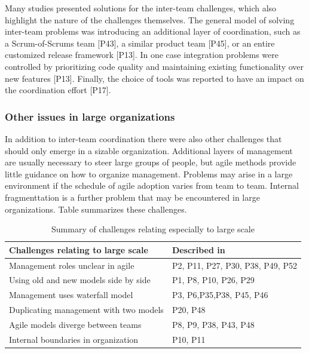\documentclass[preprint,authoryear,12pt]{elsarticle}
\begin{document}
Many studies presented solutions for the inter-team challenges, which also
highlight the nature of the challenges themselves. The general model of solving
inter-team problems was introducing an additional layer of coordination, such as
a Scrum-of-Scrums team [P43], a similar product team [P45], or an entire
customized release framework [P13]. In one case integration problems were
controlled by prioritizing code quality and maintaining existing functionality
over new features [P13]. Finally, the choice of tools was reported to have an
impact on the coordination effort [P17].



\subsubsection{Other issues in large organizations}

In addition to inter-team coordination there were also other challenges that
should only emerge in a sizable organization.
Additional layers of management are usually necessary to steer large groups of
people, but agile methods provide little guidance on how to organize management.
Problems may arise in a large environment if the schedule of agile adoption
varies from team to team. Internal fragmenttation is a further problem that may
be encountered in large organizations.
Table \label{table:challenges_largescale} summarizes these challenges.

\begin{table}[b]
    \centering
    \begin{tabular}{ >{\raggedright\arraybackslash}p{}
                     >{\raggedright\arraybackslash}p{} }
        \toprule
        Challenges relating to large scale  &  Described in \\
        \midrule
        Management roles unclear in agile       &  P2, P11, P27, P30, P38, P49, P52 \\
        Using old and new models side by side   &  P1, P8, P10, P26, P29 \\
        Management uses waterfall model         &  P3, P6,P35,P38, P45, P46  \\
        Duplicating management with two models  &  P20, P48 \\
        Agile models diverge between teams      &  P8, P9, P38, P43, P48 \\
        Internal boundaries in organization     &  P10, P11 \\
        \bottomrule
    \end{tabular}
    \caption{Summary of challenges relating especially to large scale}
    \label{table:challenges_largescale}
\end{table}
\end{document}
